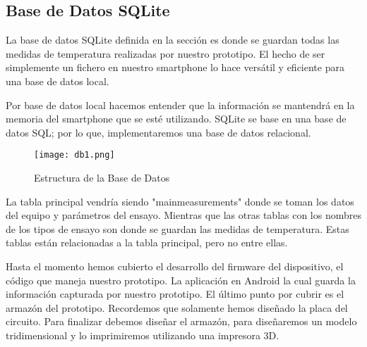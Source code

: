 \subsection{Base de Datos SQLite}

\par \noindent
La base de datos SQLite definida en la sección es donde se guardan todas las medidas de temperatura realizadas por nuestro prototipo. El hecho de ser simplemente un fichero en nuestro smartphone lo hace versátil y eficiente para una base de datos local. 


\par \noindent
Por base de datos local hacemos entender que la información se mantendrá en la memoria del smartphone que se esté utilizando. SQLite se base en una base de datos SQL; por lo que, implementaremos una base de datos relacional. 

\begin{figure}[H]
	\centering
	\texttt{[image: db1.png]}
	\caption{Estructura de la Base de Datos}
\end{figure}

\clearpage

\par \noindent
La tabla principal vendría siendo "mainmeasurements" donde se toman los datos del equipo y parámetros del ensayo. Mientras que las otras tablas con los nombres de los tipos de ensayo son donde se guardan las medidas de temperatura. Estas tablas están relacionadas a la tabla principal, pero no entre ellas.


\par \noindent
Hasta el momento hemos cubierto el desarrollo del firmware del dispositivo, el código que maneja nuestro prototipo. La aplicación en Android la cual guarda la información capturada por nuestro prototipo. El último punto por cubrir es el armazón del prototipo. Recordemos que solamente hemos diseñado la placa del circuito. Para finalizar debemos diseñar el armazón, para diseñaremos un modelo tridimensional y lo imprimiremos utilizando una impresora 3D.

